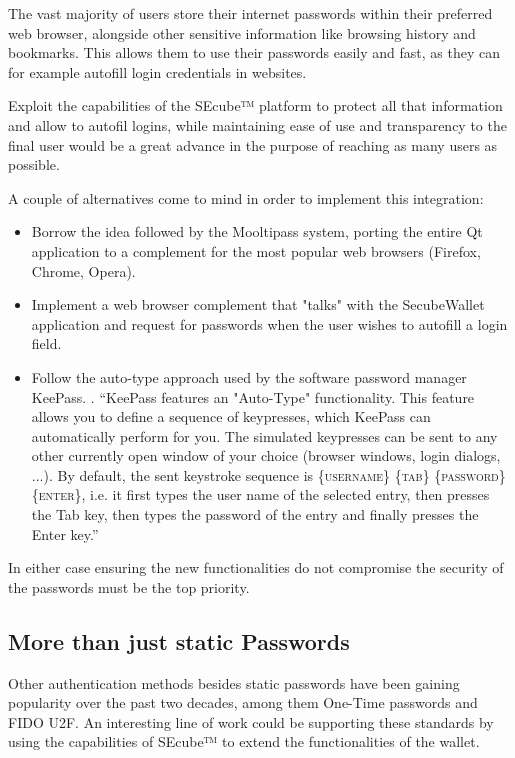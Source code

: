 The vast majority of users store their internet passwords within their preferred web browser, alongside other sensitive information like browsing history and bookmarks. This allows them to use their passwords easily and fast, as they can for example autofill login credentials in websites.

Exploit the capabilities of the SEcube™ platform to protect all that information and allow to autofil logins, while maintaining ease of use and transparency to the final user would be a great advance in the purpose of reaching as many users as possible.

A couple of alternatives come to mind in order to implement this integration:
\begin{itemize}
\setlength\itemsep{-3pt}

\item Borrow the idea followed by the Mooltipass system, porting the entire Qt application to a complement for the most popular web browsers (Firefox, Chrome, Opera).
\item Implement a web browser complement that "talks" with the SecubeWallet application and request for passwords when the user wishes to autofill a login field.
\item Follow the auto-type approach used by the software password manager KeePass. \cite{autotype}. ``KeePass features an "Auto-Type" functionality. This feature allows you to define a sequence of keypresses, which KeePass can automatically perform for you. The simulated keypresses can be sent to any other currently open window of your choice (browser windows, login dialogs, ...). By default, the sent keystroke sequence is \{\textsc{username}\} \{\textsc{tab}\} \{\textsc{password}\} \{\textsc{enter}\}, i.e. it first types the user name of the selected entry, then presses the Tab key, then types the password of the entry and finally presses the Enter key.''
\end{itemize}

In either case ensuring the new functionalities do not compromise the security of the passwords must be the top priority.

\subsection{More than just static Passwords}
Other authentication methods besides static passwords have been gaining popularity over the past two decades, among them One-Time passwords and FIDO U2F. An interesting line of work could be supporting these standards by using the capabilities of SEcube™ to extend the functionalities of the wallet.

